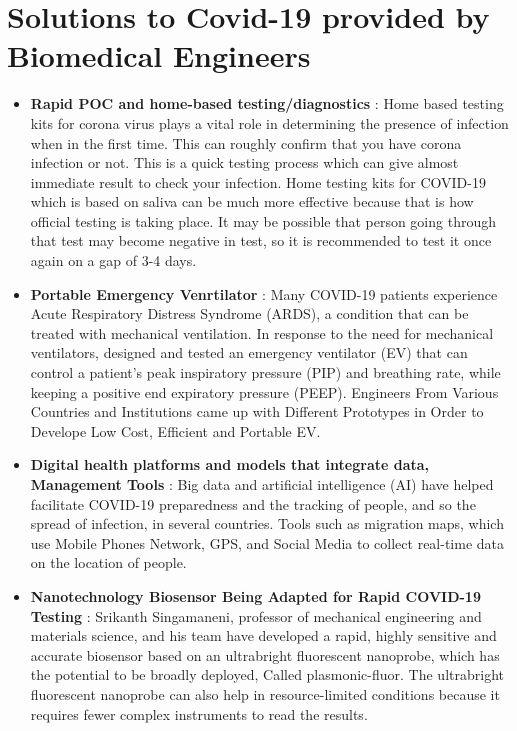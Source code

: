 \documentclass[12pt]{article}
\begin{document}
\section{Solutions to Covid-19 provided by Biomedical Engineers}
\begin{itemize}
\item \textbf{Rapid POC and home-based testing/diagnostics} : Home based testing kits for corona virus plays a vital role in determining the presence of infection when in the first time. This can roughly confirm that you have corona infection or not. This is a quick testing process which can give almost immediate result to check your infection.
Home testing kits for COVID-19 which is based on saliva can be much more effective because that is how official testing is taking place. It may be possible that person going through that test may become negative in test, so it is recommended to test it once again on a gap of 3-4 days.

\item \textbf{Portable Emergency Venrtilator} : Many COVID-19 patients experience Acute Respiratory Distress Syndrome (ARDS), a condition that can be treated with mechanical ventilation. In response to the need for mechanical ventilators, designed and tested an emergency ventilator (EV) that can control a patient's peak inspiratory pressure (PIP) and breathing rate, while keeping a positive end expiratory pressure (PEEP). Engineers From Various Countries and Institutions came up with Different Prototypes in Order to Develope Low Cost, Efficient and Portable EV.

\item \textbf{Digital health platforms and models that integrate data, Management Tools} : Big data and artificial intelligence (AI) have helped 
facilitate COVID-19 preparedness and the tracking of 
people, and so the spread of infection, in several 
countries. Tools such as migration maps, which use 
Mobile Phones Network, GPS, and Social 
Media to collect real-time data on the location of people.

\item \textbf{Nanotechnology Biosensor Being Adapted for Rapid COVID-19 Testing} : Srikanth Singamaneni, professor of mechanical engineering and materials science, and his team have developed a rapid, highly sensitive and accurate biosensor based on an ultrabright fluorescent nanoprobe, which has the potential to be broadly deployed, Called plasmonic-fluor. The ultrabright fluorescent nanoprobe can also help in resource-limited conditions because it requires fewer complex instruments to read the results.


\end{itemize}
\end{document}
